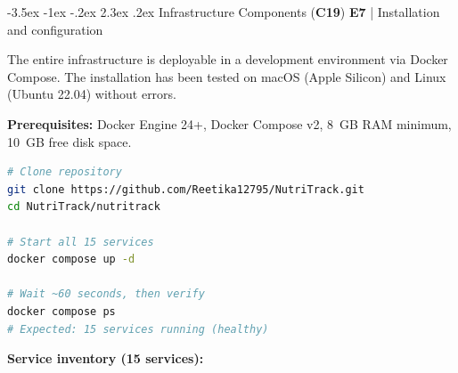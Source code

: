 \documentclass[a4paper,11pt,oneside,openany]{report}
\makeatletter
\renewcommand\section{\@startsection{section}{1}{\z@}%
  {-3.5ex \@plus -1ex \@minus -.2ex}%
  {2.3ex \@plus.2ex}%
  {\normalfont\Large\bfseries\color{ntgreen}}}
\newcommand{\competence}[1]{\textbf{\textcolor{ntgreen}{#1}}}
\newcommand{\evaluation}[1]{\textbf{\textcolor{ntblue}{#1}}}
\makeatother
\begin{document}
\section{Infrastructure Components (\competence{C19})}
\label{sec:c19}
{\small\evaluation{E7} | Installation and configuration}

The entire infrastructure is deployable in a development environment
via Docker Compose. The installation has been tested on macOS (Apple Silicon)
and Linux (Ubuntu 22.04) without errors.

\textbf{Prerequisites:} Docker Engine 24+, Docker Compose v2, 8~GB RAM minimum,
10~GB free disk space.

\begin{lstlisting}[language=bash, caption={Infrastructure deployment}]
# Clone repository
git clone https://github.com/Reetika12795/NutriTrack.git
cd NutriTrack/nutritrack

# Start all 15 services
docker compose up -d

# Wait ~60 seconds, then verify
docker compose ps
# Expected: 15 services running (healthy)
\end{lstlisting}

\textbf{Service inventory (15 services):}
\end{document}
